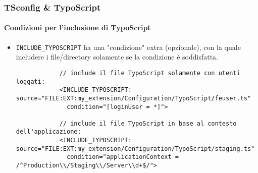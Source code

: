 \begin{frame}[fragile]
	\frametitle{TSconfig \& TypoScript}
	\framesubtitle{Condizioni per l'inclusione di TypoScript}

	\lstset{basicstyle=\tiny\ttfamily}

	\begin{itemize}

		\item \texttt{INCLUDE\_TYPOSCRIPT} ha una "condizione" extra (opzionale), con la quale
			includere i file/directory solamente se la condizione è soddisfatta.

		\begin{lstlisting}
			// include il file TypoScript solamente con utenti loggati:
			<INCLUDE_TYPOSCRIPT: source="FILE:EXT:my_extension/Configuration/TypoScript/feuser.ts"
			  condition="[loginUser = *]">

			// include il file TypoScript in base al contesto dell'applicazione:
			<INCLUDE_TYPOSCRIPT: source="FILE:EXT:my_extension/Configuration/TypoScript/staging.ts"
			  condition="applicationContext = /^Production\\/Staging\\/Server\\d+$/">
		\end{lstlisting}

	\end{itemize}

\end{frame}

